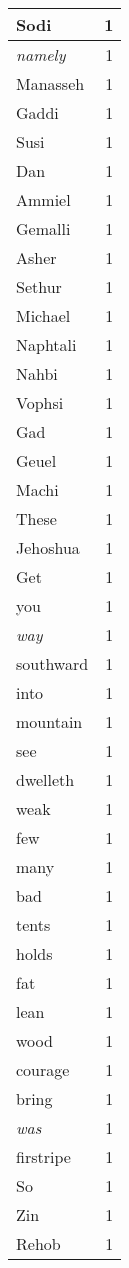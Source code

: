 \begin{center}
\begin{longtable}{l|r}
Sodi & 1\\ \hline 
\emph{namely} & 1\\ \hline 
Manasseh & 1\\ \hline 
Gaddi & 1\\ \hline 
Susi & 1\\ \hline 
Dan & 1\\ \hline 
Ammiel & 1\\ \hline 
Gemalli & 1\\ \hline 
Asher & 1\\ \hline 
Sethur & 1\\ \hline 
Michael & 1\\ \hline 
Naphtali & 1\\ \hline 
Nahbi & 1\\ \hline 
Vophsi & 1\\ \hline 
Gad & 1\\ \hline 
Geuel & 1\\ \hline 
Machi & 1\\ \hline 
These & 1\\ \hline 
Jehoshua & 1\\ \hline 
Get & 1\\ \hline 
you & 1\\ \hline 
\emph{way} & 1\\ \hline 
southward & 1\\ \hline 
into & 1\\ \hline 
mountain & 1\\ \hline 
see & 1\\ \hline 
dwelleth & 1\\ \hline 
weak & 1\\ \hline 
few & 1\\ \hline 
many & 1\\ \hline 
bad & 1\\ \hline 
tents & 1\\ \hline 
holds & 1\\ \hline 
fat & 1\\ \hline 
lean & 1\\ \hline 
wood & 1\\ \hline 
courage & 1\\ \hline 
bring & 1\\ \hline 
\emph{was} & 1\\ \hline 
firstripe & 1\\ \hline 
So & 1\\ \hline 
Zin & 1\\ \hline 
Rehob & 1\\ \hline 

\end{longtable}
\end{center}

